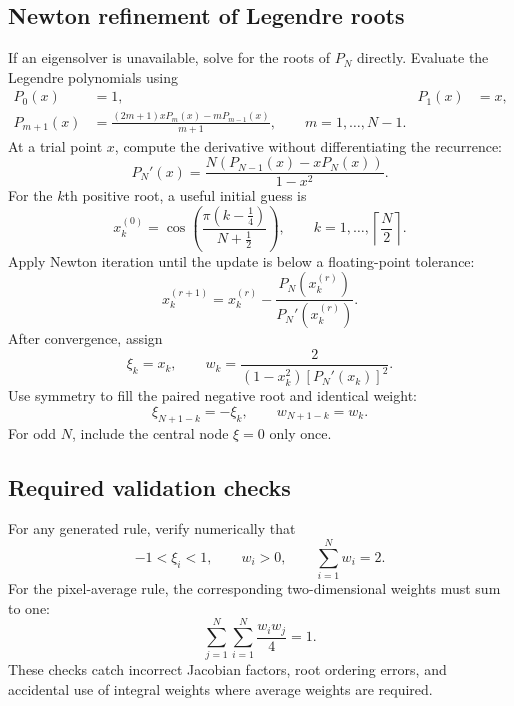\documentclass[11pt,a4paper]{article}
\begin{document}
\subsection{Newton refinement of Legendre roots}

If an eigensolver is unavailable, solve for the roots of \(P_N\) directly.
Evaluate the Legendre polynomials using
\begin{align}
    P_0(x)&=1, &
    P_1(x)&=x,\\
    P_{m+1}(x)&=
    \frac{(2m+1)xP_m(x)-mP_{m-1}(x)}{m+1},
    \qquad m=1,\ldots,N-1.
    \label{eq:legendre-recurrence}
\end{align}
At a trial point \(x\), compute the derivative without differentiating the
recurrence:
\begin{equation}
    P_N'(x)
    =
    \frac{N\left(P_{N-1}(x)-xP_N(x)\right)}{1-x^2}.
    \label{eq:legendre-derivative}
\end{equation}
For the \(k\)th positive root, a useful initial guess is
\begin{equation}
    x_k^{(0)}
    =
    \cos\left(
        \frac{\pi(k-\tfrac14)}{N+\tfrac12}
    \right),
    \qquad
    k=1,\ldots,\left\lceil\frac{N}{2}\right\rceil.
    \label{eq:root-initial-guess}
\end{equation}
Apply Newton iteration until the update is below a floating-point tolerance:
\begin{equation}
    x_k^{(r+1)}
    =
    x_k^{(r)}
    -
    \frac{P_N(x_k^{(r)})}{P_N'(x_k^{(r)})}.
    \label{eq:newton-legendre}
\end{equation}
After convergence, assign
\begin{equation}
    \boxed{
        \xi_k=x_k,
        \qquad
        w_k=
        \frac{2}
        {(1-x_k^2)[P_N'(x_k)]^2}.
    }
    \label{eq:arbitrary-order-weight}
\end{equation}
Use symmetry to fill the paired negative root and identical weight:
\[
    \xi_{N+1-k}=-\xi_k,
    \qquad
    w_{N+1-k}=w_k.
\]
For odd \(N\), include the central node \(\xi=0\) only once.

\subsection{Required validation checks}

For any generated rule, verify numerically that
\[
    -1<\xi_i<1,\qquad
    w_i>0,\qquad
    \sum_{i=1}^{N}w_i=2.
\]
For the pixel-average rule, the corresponding two-dimensional weights must
sum to one:
\[
    \sum_{j=1}^{N}\sum_{i=1}^{N}
    \frac{w_iw_j}{4}=1.
\]
These checks catch incorrect Jacobian factors, root ordering errors, and
accidental use of integral weights where average weights are required.
\end{document}
